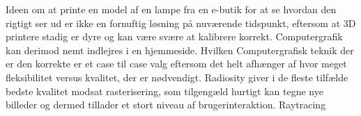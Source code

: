 Ideen om at printe en model af en lampe fra en e-butik for at se hvordan den rigtigt ser ud er ikke en fornuftig løsning på nuværende tidspunkt, eftersom at 3D printere stadig er dyre og kan være svære at kalibrere korrekt. Computergrafik kan derimod nemt indlejres i en hjemmeside. Hvilken Computergrafisk teknik der er den korrekte er et case til case valg eftersom det helt afhænger af hvor meget fleksibilitet versus kvalitet, der er nødvendigt. Radiosity giver i de fleste tilfælde bedste kvalitet modsat rasterisering, som tilgengæld hurtigt kan tegne nye billeder og dermed tillader et stort niveau af brugerinteraktion. Raytracing 